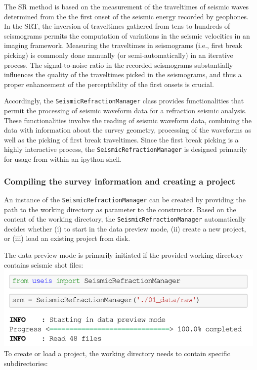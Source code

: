 \documentclass[a4paper,fleqn]{cas-sc}
\begin{document}
The SR method is based on the measurement of the traveltimes of seismic waves determined from the the first onset of the seismic energy recorded by geophones. In the SRT, the inversion of traveltimes gathered from tens to hundreds of seismograms permits the computation of variations in the seismic velocities in an imaging framework. Measuring the traveltimes in seismograms (i.e., first break picking) is commonly done manually (or semi-automatically) in an iterative process. The signal-to-noise ratio in the recorded seismograms substantially influences the quality of the traveltimes picked in the seismograms, and thus a proper enhancement of the perceptibility of the first onsets is crucial.

Accordingly, the \texttt{SeismicRefractionManager} class provides functionalities that permit the processing of seismic waveform data for a refraction seismic analysis. These functionalities involve the reading of seismic waveform data, combining the data with information about the survey geometry, processing of the waveforms as well as the picking of first break traveltimes. Since the first break picking is a highly interactive process, the \texttt{SeismicRefractionManager} is designed primarily for usage from within an ipython shell.

\subsubsection{Compiling the survey information and creating a project}

An instance of the \texttt{SeismicRefractionManager} can be created by providing the path to the working directory as parameter to the constructor. Based on the content of the working directory, the \texttt{SeismicRefractionManager} automatically decides whether (i) to start in the data preview mode, (ii) create a new project, or (iii) load an existing project from disk.

The data preview mode is primarily initiated if the provided working directory contains seismic shot files:
\newline
\includegraphics[width=.5\textwidth]{./figures/data_preview_mode.pdf}
\newline
To create or load a project, the working directory needs to contain specific subdirectories:
\end{document}
